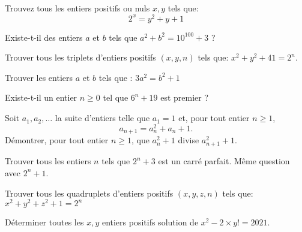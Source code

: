 \smallskip


\begin{exo}
Trouvez tous les entiers positifs ou nuls $x,y$ tels que:
 $$2^x=y^2+y+1$$
\end{exo}


\begin{exo}
Existe-t-il des entiers $a$ et $b$ tels que $a^2 + b^2 = 10^{100} + 3$ ?
\end{exo}


\begin{exo} Trouver tous les triplets  d'entiers positifs $(x,y,n)$ tels que:
$x^2+y^2+41=2^n$.
\end{exo}


\begin{exo}
Trouver les entiers $a$ et $b$ tels que : $3a^2=b^2+1$
\end{exo}


\begin{exo}
Existe-t-il un entier $n\geq 0$ tel que $6^n+19$ est premier ?
\end{exo}


\begin{exo}
Soit $a_1,a_2,\ldots$ la suite d'entiers telle que $a_1 = 1$ et,
pour tout entier $n \geqslant 1$,
\[a_{n+1} = a_n^2+a_n+1.\]
Démontrer, pour tout entier $n \geqslant 1$, que
$a_n^2+1$ divise $a_{n+1}^2+1$.
\end{exo}


\begin{exo}
Trouver tous les entiers $n$ tels que $2^n + 3$ est un carré parfait. Même question avec $2^n + 1$.
\end{exo}


\begin{exo} Trouver tous les quadruplets d'entiers positifs $(x,y,z,n)$ tels que: $x^2+y^2+z^2+1=2^n$
\end{exo}


\begin{exo}
Déterminer toutes les $x,y$ entiers positifs solution de $x^2-2\times y!=2021$.
\end{exo}






